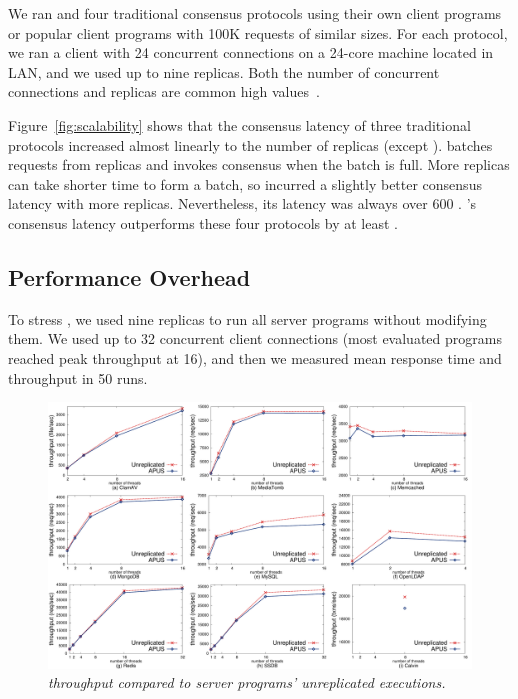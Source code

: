We ran \xxx and four traditional consensus protocols using their own 
client programs or popular client programs with 100K requests of similar sizes. 
For each protocol, we ran a client with 24 concurrent connections on a 24-core 
machine located in LAN, and we used up to nine replicas. Both the number of 
concurrent connections and replicas are common high 
values~\cite{zookeeper,crane:sosp15,rex:eurosys14,dare:hpdc15}.

Figure~\ref{fig:scalability} shows that the consensus latency of three 
traditional protocols increased almost linearly to the number of replicas 
(except \spaxos). \spaxos batches requests from replicas and invokes consensus 
when the batch is full. More replicas can take shorter time to form a batch, so 
\spaxos incurred a slightly better consensus latency with more replicas. 
Nevertheless, its latency was always over 600 \us. \xxx's consensus latency 
outperforms these four protocols by at least \comptradlow.

\subsection{Performance Overhead} \label{sec:overhead}

To stress \xxx, we used nine replicas to run all \nprog server 
programs without modifying them. We used up to 32 concurrent 
client connections (most evaluated programs reached peak throughput at 
16), and then we measured mean response time and throughput in 50 runs.

\begin{figure}[t]
\includegraphics[width=6in]{figures/throughput}
\caption{\small {\em \xxx throughput compared to server programs' unreplicated
executions.}}
\label{fig:tput}
\end{figure}


